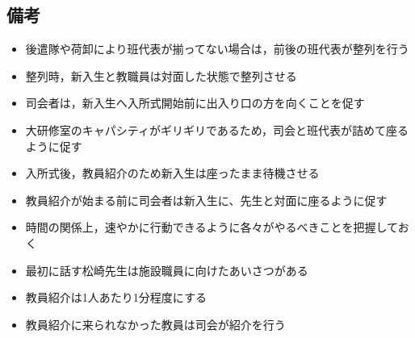 \subsection{備考}
\begin{itemize}
\item 後遣隊や荷卸により班代表が揃ってない場合は，前後の班代表が整列を行う
\item 整列時，新入生と教職員は対面した状態で整列させる
\item 司会者は，新入生へ入所式開始前に出入り口の方を向くことを促す
\item 大研修室のキャパシティがギリギリであるため，司会と班代表が詰めて座るように促す
\item 入所式後，教員紹介のため新入生は座ったまま待機させる
\item 教員紹介が始まる前に司会者は新入生に、先生と対面に座るように促す
\item 時間の関係上，速やかに行動できるように各々がやるべきことを把握しておく
\item 最初に話す松崎先生は施設職員に向けたあいさつがある
\item 教員紹介は1人あたり1分程度にする
\item 教員紹介に来られなかった教員は司会が紹介を行う
\end{itemize}



%
